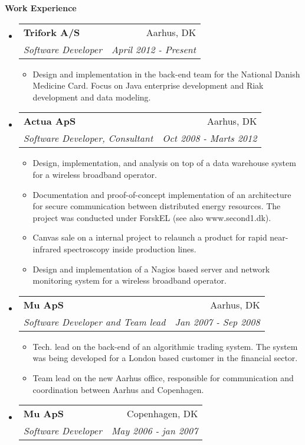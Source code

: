 \documentclass[a4paper,11pt]{article}
\makeatletter
\newcommand{\resitem}[1]{\item #1 \vspace{-2pt}}
\newcommand{\resheading}[1]{{\vspace{5mm}\Large
    \colorbox{mygrey}{\begin{minipage}{\textwidth}{\textbf{#1
            \vphantom{p\^{E}}}}\end{minipage}}}}
\newcommand{\ressubheading}[4]{
\begin{tabular*}{172mm}{l@{\extracolsep{\fill}}r}
		\textbf{#1} & #2 \\
		\textit{#3} & \textit{#4} \\
\end{tabular*}\vspace{-6pt}}
\makeatother
\begin{document}
\resheading{Work Experience}
\begin{itemize}
\item \ressubheading{Trifork A/S}{Aarhus, DK}{Software Developer}{April 2012 - Present}
  \begin{itemize}

    \resitem{Design and implementation in the back-end team for the
      National Danish Medicine Card.  Focus on Java enterprise
      development and Riak development and data modeling.}

  \end{itemize}

\item \ressubheading{Actua ApS}{Aarhus, DK}{Software Developer, Consultant}{Oct 2008 - Marts 2012}
  \begin{itemize}

    \resitem{Design, implementation, and analysis on top of a data
      warehouse system for a wireless broadband operator.}

    \resitem{Documentation and proof-of-concept implementation of an
      architecture for secure communication between distributed energy
      resources.  The project was conducted under ForskEL (see also
      www.second1.dk).}

    \resitem{Canvas sale on a internal project to relaunch a product
      for rapid near-infrared spectroscopy inside production lines.}

    \resitem{Design and implementation of a Nagios based server and
      network monitoring system for a wireless broadband operator.}

  \end{itemize}

\item  \ressubheading{Mu ApS}{Aarhus, DK}{Software Developer and Team lead}{Jan 2007 - Sep 2008}

  \begin{itemize}

    \resitem{Tech. lead on the back-end of an algorithmic trading
      system.  The system was being developed for a London based
      customer in the financial sector.}

    \resitem{Team lead on the new Aarhus office, responsible for
      communication and coordination between Aarhus and Copenhagen.}

  \end{itemize}

\item  \ressubheading{Mu ApS}{Copenhagen, DK}{Software Developer}{May 2006 - jan 2007}


\end{itemize}
\end{document}
